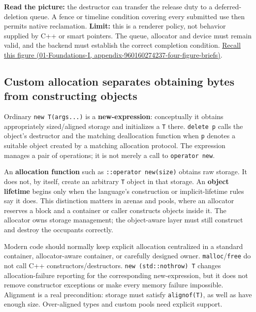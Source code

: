 \textbf{Read the picture:} the destructor can transfer the release duty to a deferred-deletion queue. A fence or timeline condition covering every submitted use then permits native reclamation. \textbf{Limit:} this is a renderer policy, not behavior supplied by C++ or smart pointers. The queue, allocator and device must remain valid, and the backend must establish the correct completion condition. \href{../01-Foundations-I/main.pdf\#nameddest=appendix-960160274237-four-figure-briefs}{Recall this figure (01-Foundations-I, appendix-960160274237-four-figure-briefs)}.

\subsection{Custom allocation separates obtaining bytes from constructing objects}\label{05-engine-i-ch004-custom-allocation-separates-obtaining-bytes-from-constructing-objects}

Ordinary \texttt{new\ T(args...)} is a \textbf{new-expression}: conceptually it obtains appropriately sized/aligned storage and initializes a \texttt{T} there. \texttt{delete\ p} calls the object's destructor and the matching deallocation function when \texttt{p} denotes a suitable object created by a matching allocation protocol. The expression manages a pair of operations; it is not merely a call to \texttt{operator\ new}.

An \textbf{allocation function} such as \texttt{::operator\ new(size)} obtains raw storage. It does not, by itself, create an arbitrary \texttt{T} object in that storage. An \textbf{object lifetime} begins only when the language's construction or implicit-lifetime rules say it does. This distinction matters in arenas and pools, where an allocator reserves a block and a container or caller constructs objects inside it. The allocator owns storage management; the object-aware layer must still construct and destroy the occupants correctly.

Modern code should normally keep explicit allocation centralized in a standard container, allocator-aware container, or carefully designed owner. \texttt{malloc}/\texttt{free} do not call C++ constructors/destructors. \texttt{new\ (std::nothrow)\ T} changes allocation-failure reporting for the corresponding new-expression, but it does not remove constructor exceptions or make every memory failure impossible. Alignment is a real precondition: storage must satisfy \texttt{alignof(T)}, as well as have enough size. Over-aligned types and custom pools need explicit support.


